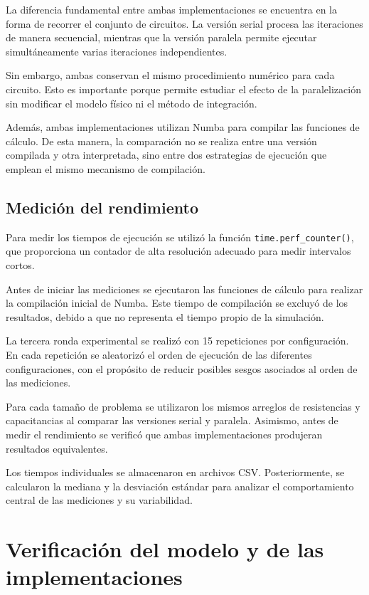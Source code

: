 \documentclass[11pt,a4paper]{article}
\begin{document}
La diferencia fundamental entre ambas implementaciones se encuentra en la forma de recorrer el conjunto de circuitos. La versión serial procesa las iteraciones de manera secuencial, mientras que la versión paralela permite ejecutar simultáneamente varias iteraciones independientes.

Sin embargo, ambas conservan el mismo procedimiento numérico para cada circuito. Esto es importante porque permite estudiar el efecto de la paralelización sin modificar el modelo físico ni el método de integración.

Además, ambas implementaciones utilizan Numba para compilar las funciones de cálculo. De esta manera, la comparación no se realiza entre una versión compilada y otra interpretada, sino entre dos estrategias de ejecución que emplean el mismo mecanismo de compilación.

\subsection{Medición del rendimiento}

Para medir los tiempos de ejecución se utilizó la función \texttt{time.perf\_counter()}, que proporciona un contador de alta resolución adecuado para medir intervalos cortos.

Antes de iniciar las mediciones se ejecutaron las funciones de cálculo para realizar la compilación inicial de Numba. Este tiempo de compilación se excluyó de los resultados, debido a que no representa el tiempo propio de la simulación.

La tercera ronda experimental se realizó con 15 repeticiones por configuración. En cada repetición se aleatorizó el orden de ejecución de las diferentes configuraciones, con el propósito de reducir posibles sesgos asociados al orden de las mediciones.

Para cada tamaño de problema se utilizaron los mismos arreglos de resistencias y capacitancias al comparar las versiones serial y paralela. Asimismo, antes de medir el rendimiento se verificó que ambas implementaciones produjeran resultados equivalentes.

Los tiempos individuales se almacenaron en archivos CSV. Posteriormente, se calcularon la mediana y la desviación estándar para analizar el comportamiento central de las mediciones y su variabilidad.



\section{Verificación del modelo y de las implementaciones}
\end{document}
